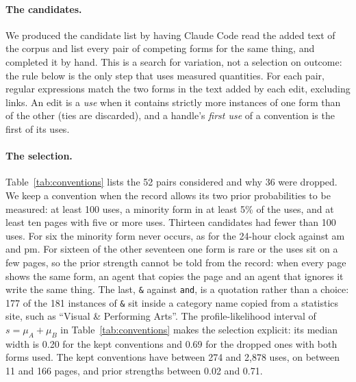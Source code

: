\documentclass[10pt]{article}
\begin{document}
\paragraph{The candidates.} We produced the candidate list by having Claude Code read the added text of the corpus and list every pair of competing forms for the same thing, and completed it by hand. This is a search for variation, not a selection on outcome: the rule below is the only step that uses measured quantities. For each pair, regular expressions match the two forms in the text added by each edit, excluding links. An edit is a \emph{use} when it contains strictly more instances of one form than of the other (ties are discarded), and a handle's \emph{first use} of a convention is the first of its uses.

\paragraph{The selection.} Table~\ref{tab:conventions} lists the 52 pairs considered and why 36 were dropped. We keep a convention when the record allows its two prior probabilities to be measured: at least 100 uses, a minority form in at least 5\% of the uses, and at least ten pages with five or more uses. Thirteen candidates had fewer than 100 uses. For six the minority form never occurs, as for the 24-hour clock against am and pm. For sixteen of the other seventeen one form is rare or the uses sit on a few pages, so the prior strength cannot be told from the record: when every page shows the same form, an agent that copies the page and an agent that ignores it write the same thing. The last, \texttt{\&} against \texttt{and}, is a quotation rather than a choice: 177 of the 181 instances of \texttt{\&} sit inside a category name copied from a statistics site, such as ``Visual \& Performing Arts''. The profile-likelihood interval of $s=\mu_A+\mu_B$ in Table~\ref{tab:conventions} makes the selection explicit: its median width is 0.20 for the kept conventions and 0.69 for the dropped ones with both forms used. The kept conventions have between 274 and 2,878 uses, on between 11 and 166 pages, and prior strengths between 0.02 and 0.71.

\begin{table}[htbp]\centering\scriptsize
\caption{\textbf{The 52 candidate conventions.} Uses (edits with strictly more of one form than the other), pages with five or more uses, share of the minority form, and the prior strength $s = \mu_A + \mu_B$ of Eq.~\eqref{eq:copy} with its 95\% profile-likelihood interval, fitted on all uses with at least three instances in view (for conventions with at least 100 uses in which both forms occur). A convention is kept if it has at least 100 uses, at least 10 pages and a minority of at least 5\%; the last column names the failed criteria.}\label{tab:conventions}

\end{table}
\end{document}
